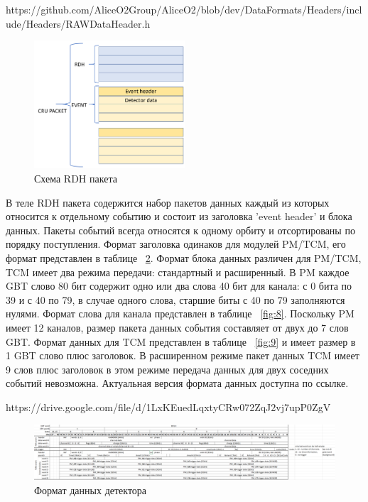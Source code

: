 \documentclass{article}
\begin{document}
https://github.com/AliceO2Group/AliceO2/blob/dev/DataFormats/Headers/include/Headers/RAWDataHeader.h


\begin{figure}[H]
	\centering 
	\includegraphics[width=0.5\textwidth]{RDH_scheme.png}
	\caption{\label{fig:6} Схема RDH пакета}
\end{figure}



В теле RDH пакета содержится набор пакетов данных каждый из которых относится к отдельному событию и состоит из заголовка 'event header' и блока данных. Пакеты событий всегда относятся к одному орбиту и отсортированы по порядку поступления. Формат заголовка одинаков для модулей PM/TCM, его формат представлен в таблице ~\ref{fig:7}. Формат блока данных различен для PM/TCM, TCM имеет два режима передачи: стандартный и расширенный. В PM каждое GBT слово 80 бит содержит одно или два слова 40 бит для канала: с 0 бита по 39 и с 40 по 79, в случае одного слова, старшие биты с 40 по 79 заполняются нулями. Формат слова для канала представлен в таблице ~\ref{fig:8}. Поскольку PM имеет 12 каналов, размер пакета данных события составляет от двух до 7 слов GBT. Формат данных для TCM представлен в таблице ~\ref{fig:9} и имеет размер в 1 GBT слово плюс заголовок. В расширенном режиме пакет данных TCM имеет 9 слов плюс заголовок в этом режиме передача данных для двух соседних событий невозможна. Актуальная версия формата данных доступна по ссылке.

https://drive.google.com/file/d/1LxKEuedLqxtyCRw072ZqJ2vj7upP0ZgV



\begin{figure}[H]
	\centering 
	\includegraphics[width=1\textwidth]{readout_format.png}
	\caption{\label{fig:7} Формат данных детектора}
\end{figure}
\end{document}
